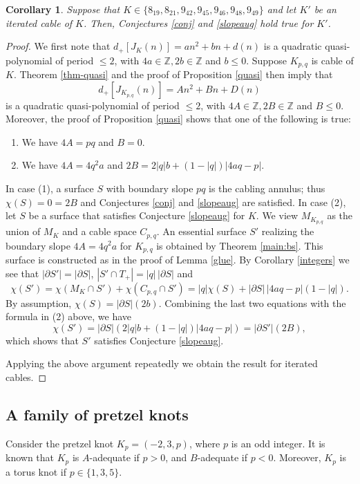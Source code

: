 \documentclass[11pt]{amsart}
\newtheorem{corollary}[theorem]{Corollary}
\theoremstyle{definition}
\newcommand{\M}{M_{K_{p,q}}}
\newcommand{\C}{{C_{p, q}}}
\newcommand{\K}{{K_{p, q}}}
\newcommand{\abs}[1]{{\left\vert #1 \right\vert}}
\def\BZ{\mathbb Z}
\begin{document}
\begin{corollary}\label{conjcables} Suppose that $K\in \{ 8_{19},  8_{21}, 9_{42}, 9_{45}, 9_{46},
9_{48}, 9_{49} \}$ and let $K'$ be an iterated cable of $K$. Then, Conjectures \ref{conj} and  \ref{slopeaug}
hold true for $K'$.
\end{corollary}
\begin{proof}
We first note that $
d_+[J_{K}(n)]=an^2+bn+d(n)
$
is a quadratic quasi-polynomial of period $\le 2$, with $4a \in \BZ, 2b \in \BZ$ and $b \le 0$. Suppose
${K_{p,q}}$ is cable of $K$.
Theorem \ref{thm-quasi} and the proof of Proposition \ref{quasi} then imply that 
$$
d_+[J_{K_{p,q}}(n)]=An^2+Bn+D(n)
$$
is a quadratic quasi-polynomial of period $\le 2$, with $4A \in \BZ, 2B \in \BZ$ and $B \le 0$.
Moreover, the proof of Proposition \ref{quasi} shows that one of the following is true:
\begin{enumerate}
\item We have $4A=pq$ and $B=0$.
\item We have $4A=4q^2a$ and $2B=2 \abs{q} b+ (1- \abs{q}) \abs{4aq-p}$.

\end{enumerate}
 In case (1), a surface $S$ with boundary slope $pq$ is the cabling annulus; thus $\chi(S)=0=2B$
and Conjectures \ref{conj} and  \ref{slopeaug} are satisfied.
In case (2),  let $S$ be a surface that satisfies Conjecture \ref{slopeaug}
for $K$. We view $\M$ as the union of $M_K$ and a cable space $\C$.
An essential  surface $S'$ realizing the boundary slope $4A=4q^2a$ for $\K$ 
is obtained by Theorem \ref{main:bs}. This surface is constructed as in the proof of Lemma \ref{glue}.
By  Corollary \ref{integers} we see that $\abs{\partial S'}=\abs{\partial S}$,
$\abs {S'\cap T_{+}}=\abs{q} \, \abs{\partial S}$ and
$$\chi(S')=\chi(M_K\cap S')+\chi(\C \cap S')=\abs{q}  \chi(S)+\abs{\partial S} \, \abs{4aq-p} (1- \abs{q} ).$$
By assumption, $\chi(S)=\abs{\partial S} (2b)$.
Combining the last  two equations with the formula in (2) above, we have
$$\chi(S')=\abs{\partial S} \left( 2 \abs{q} b+ (1-\abs{q}) \abs{4aq-p}\right)=\abs{\partial S'}(2B),$$
which shows that $S'$ satisfies Conjecture \ref{slopeaug}.

Applying the above argument repeatedly we obtain the result for iterated cables.
\end{proof}






\subsection{A family of pretzel knots}
 Consider the pretzel knot $K_p=(-2,3,p)$, where $p$ is an odd integer. It is known that $K_p$ is $A$-adequate if $p>0$, and $B$-adequate if $p<0$. Moreover, $K_p$ is a torus knot if $p \in \{1,3,5\}$. 
\end{document}
